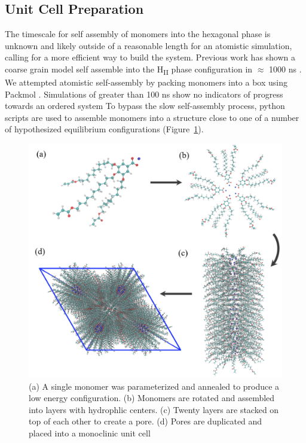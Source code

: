\documentclass{article}
\begin{document}
  \subsection{Unit Cell Preparation}

  The timescale for self assembly of monomers into the hexagonal phase is
  unknown and likely outside of a reasonable length for an atomistic simulation,
  calling for a more efficient way to build the system.  Previous work has shown
  a coarse grain model self assemble into the H\textsubscript{II} phase
  configuration in $\approx$ 1000 ns \cite{mondal_self-assembly_2013}.  We
  attempted atomistic self-assembly by packing monomers into a box using Packmol
  \cite{martinez_packmol:_2009}.  Simulations of greater than 100 ns show no
  indicators of progress towards an ordered system To bypass the slow
  self-assembly process, python scripts are used to assemble monomers into a
  structure close to one of a number of hypothesized equilibrium configurations
  (Figure~\ref{fig:python}).

  \begin{figure}
	\centering
	\includegraphics[width=0.75\linewidth]{build.PNG} %
	\caption{(a) A single monomer was parameterized and annealed to produce a low energy
		configuration. (b) Monomers are rotated and assembled into layers with 
		hydrophlic centers. (c) Twenty layers are stacked on top of each other to create
		a pore. (d) Pores are duplicated and placed into a monoclinic unit cell}\label{fig:python}
  \end{figure}
  
\end{document}
